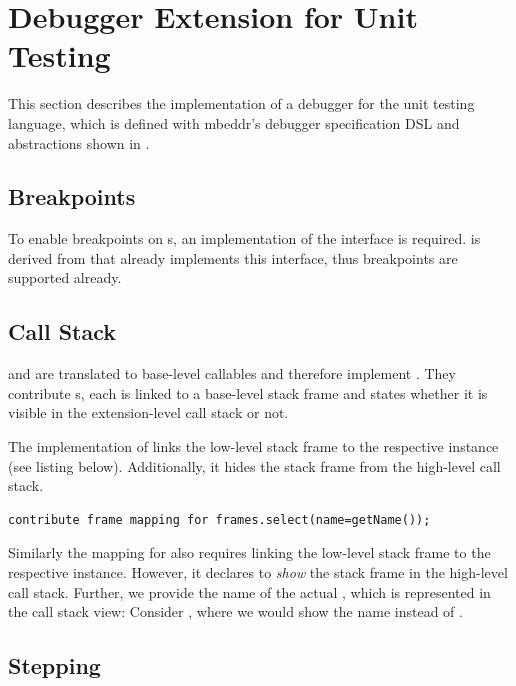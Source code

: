 \section{Debugger Extension for Unit Testing}

This section describes the implementation of a debugger
for the unit testing language, which is defined with mbeddr's debugger
specification \ac{DSL} and abstractions shown in .

\subsection{Breakpoints}  To enable
breakpoints on s, 
an implementation of the  interface is required.
 is derived from  that already implements
this interface, thus breakpoints are supported already.

\subsection{Call Stack}

 and  are translated to 
base-level callables and therefore implement
. They contribute s, 
each is linked to a base-level stack frame and
states whether it is visible in the extension-level call stack or not.

The implementation of   links the
low-level stack frame to the respective instance (see listing below).
Additionally, it hides the stack frame 
from the high-level call stack.

\begin{lstlisting}[language=debuggerDSL,frame=single]
contribute frame mapping for frames.select(name=getName());
\end{lstlisting}

Similarly the mapping for  also requires linking the
low-level stack frame to the respective instance. However, 
it declares to \emph{show} the stack frame in the high-level call stack.
Further, we provide the name of the actual , which is represented
in the call stack view: Consider , where we would
show the name  instead of .

\subsection{Stepping} 

